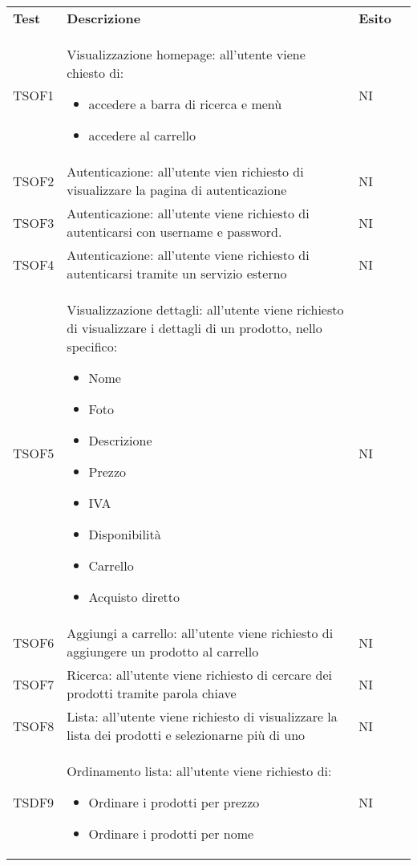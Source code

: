 \begin{center}
    \centering
    \renewcommand{\arraystretch}{1.8}
    \label{tab:TestAccettazione}
    \begin{longtable}[!h]{p{50px} p{245px} p{75px} p{50px}}
        \rowcolor{logo!70} \textbf{Test} & \textbf{Descrizione} & \textbf{Esito} \\
        TSOF1   & Visualizzazione homepage: all'utente viene chiesto di: \begin{itemize} \item accedere a barra di ricerca e menù \item accedere al carrello \end{itemize} & NI \\
        TSOF2   & Autenticazione: all'utente vien richiesto di visualizzare la pagina di autenticazione & NI \\
        TSOF3   & Autenticazione: all'utente viene richiesto di autenticarsi con username e password. & NI \\
        TSOF4   & Autenticazione: all'utente viene richiesto di autenticarsi tramite un servizio esterno & NI \\
        TSOF5   & Visualizzazione dettagli: all'utente viene richiesto di visualizzare i dettagli di un prodotto, nello specifico: \begin{itemize} \item Nome \item Foto \item Descrizione \item Prezzo\item IVA \item Disponibilit\`a \item Carrello \item Acquisto diretto \end{itemize} & NI \\
        TSOF6   & Aggiungi a carrello: all'utente viene richiesto di aggiungere un prodotto al carrello & NI \\
        TSOF7   & Ricerca: all'utente viene richiesto di cercare dei prodotti tramite parola chiave & NI \\
        TSOF8   & Lista: all'utente viene richiesto di visualizzare la lista dei prodotti e selezionarne pi\`u di uno & NI \\
        TSDF9   & Ordinamento lista: all'utente viene richiesto di: \begin{itemize} \item Ordinare i prodotti per prezzo \item Ordinare i prodotti per nome \end{itemize}& NI \\

\end{longtable}
\end{center}
